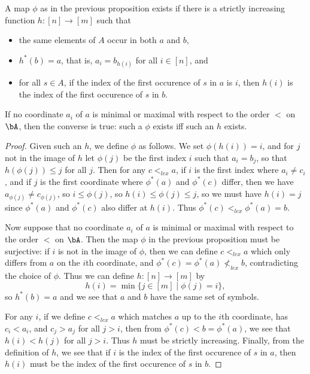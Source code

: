 \begin{prop} A map $\phi$ as in the previous proposition exists if there is a strictly increasing function $h : [n] \rightarrow [m]$ such that
\begin{itemize}
\item the same elements of $A$ occur in both $a$ and $b$,
\item $h^*(b) = a$, that is, $a_i = b_{h(i)}$ for all $i \in [n]$, and
\item for all $s \in A$, if the index of the first occurence of $s$ in $a$ is $i$, then $h(i)$ is the index of the first occurence of $s$ in $b$.
\end{itemize}
If no coordinate $a_i$ of $a$ is minimal or maximal with respect to the order $<$ on $\bA$, then the converse is true: such a $\phi$ exists iff such an $h$ exists.
\end{prop}
\begin{proof} Given such an $h$, we define $\phi$ as follows. We set $\phi(h(i)) = i$, and for $j$ not in the image of $h$ let $\phi(j)$ be the first index $i$ such that $a_i = b_j$, so that $h(\phi(j)) \le j$ for all $j$. Then for any $c <_{lex} a$, if $i$ is the first index where $a_i \ne c_i$, and if $j$ is the first coordinate where $\phi^*(a)$ and $\phi^*(c)$ differ, then we have $a_{\phi(j)} \ne c_{\phi(j)}$, so $i \le \phi(j)$, so $h(i) \le \phi(j) \le j$, so we must have $h(i) = j$ since $\phi^*(a)$ and $\phi^*(c)$ also differ at $h(i)$. Thus $\phi^*(c) <_{lex} \phi^*(a) = b$.

Now suppose that no coordinate $a_i$ of $a$ is minimal or maximal with respect to the order $<$ on $\bA$. Then the map $\phi$ in the previous proposition must be surjective: if $i$ is not in the image of $\phi$, then we can define $c <_{lex} a$ which only differs from $a$ on the $i$th coordinate, and $\phi^*(c) = \phi^*(a) \not<_{lex} b$, contradicting the choice of $\phi$. Thus we can define $h : [n] \rightarrow [m]$ by
\[
h(i) = \min\{j \in [m] \mid \phi(j) = i\},
\]
so $h^*(b) = a$ and we see that $a$ and $b$ have the same set of symbols.

For any $i$, if we define $c <_{lex} a$ which matches $a$ up to the $i$th coordinate, has $c_i < a_i$, and $c_j > a_j$ for all $j > i$, then from $\phi^*(c) < b = \phi^*(a)$, we see that $h(i) < h(j)$ for all $j > i$. Thus $h$ must be strictly increasing. Finally, from the definition of $h$, we see that if $i$ is the index of the first occurence of $s$ in $a$, then $h(i)$ must be the index of the first occurence of $s$ in $b$.
\end{proof}

